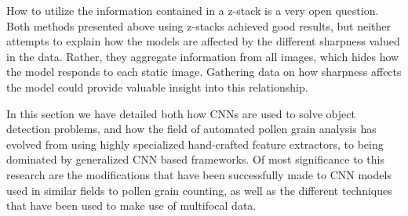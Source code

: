 How to utilize the information contained in a z-stack is a very open question.
Both methods presented above using z-stacks achieved good results, but neither attempts to explain how the models are affected by the different sharpness valued in the data.
Rather, they aggregate information from all images, which hides how the model responds to each static image.
Gathering data on how sharpness affects the model could provide valuable insight into this relationship.

In this section we have detailed both how CNNs are used to solve object detection problems, and how the field of automated pollen grain analysis has evolved from using highly specialized hand-crafted feature extractors, to being dominated by generalized CNN based frameworks.
Of most significance to this research are the modifications that have been successfully made to CNN models used in similar fields to pollen grain counting, as well as the different techniques that have been used to make use of multifocal data.

